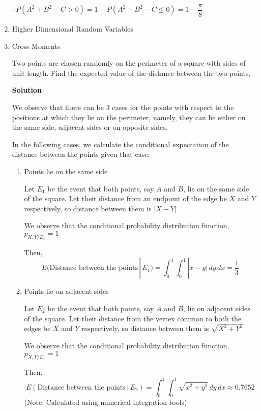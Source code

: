 \documentclass[12pt, oneside]{article}
\begin{document}
\begin{enumerate}
{    \(\therefore P(A^2 + B^2 - C > 0) = 1 - P(A^2 + B^2 - C \leq 0) = 1 - \dfrac{\pi}{8}\)
}

\item Higher Dimensional Random Variables

\item {
    Cross Moments

    Two points are chosen randomly on the perimeter of a square with sides of unit length.
    Find the expected value of the distance between the two points.

    \textbf{Solution}

    We observe that there can be 3 cases for the points with respect to the positions at
    which they lie on the perimeter, namely, they can lie either on the same side, adjacent
    sides or on opposite sides.

    In the following cases, we calculate the conditional expectation of the distance between
    the points given that case:

    \begin{enumerate}
        \item {
            Points lie on the same side

            Let \(E_1\) be the event that both points, say \(A\) and \(B\), lie on
            the same side of the square. Let their distance from an endpoint of the edge
            be \(X\) and \(Y\) respectively, so distance between them is \(|X - Y|\)

            We observe that the conditional probability distribution function,
            \(p_{X, Y / E_1} = 1\) 

            Then, \[
                E(\text{Distance between the points} \,|\, E_1) = \int_{0}^{1} \int_{0}^{1}
                   |x - y| \,dy \,dx = \frac{1}{3}
            \]
        }

        \item {
            Points lie on adjacent sides

            Let \(E_2\) be the event that both points, say \(A\) and \(B\), lie on
            adjacent sides of the square. Let their distance from the vertex common to
            both the edges be \(X\) and \(Y\) respectively, so distance between them is
            \(\sqrt{X^2 + Y^2}\)

            We observe that the conditional probability distribution function,
            \(p_{X, Y / E_1} = 1\) 

            Then. \[
                E(\text{Distance between the points} \,|\, E_2) = \int_{0}^{1} \int_{0}^{1}
                \sqrt{x^2 + y^2} \,dy \,dx \approx 0.7652
            \]
            \hfill (Note: Calculated using numerical integration tools)
        }


\end{enumerate}}
\end{enumerate}
\end{document}
